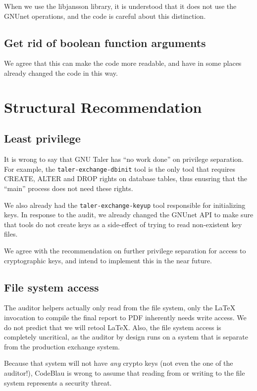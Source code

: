 \documentclass[11pt]{article}
\begin{document}
When we use the libjansson library, it is understood that it does not use
the GNUnet operations, and the code is careful about this distinction.

\subsection{Get rid of boolean function arguments}

We agree that this can make the code more readable, and have in some places
already changed the code in this way.

\section{Structural Recommendation}

\subsection{Least privilege}

It is wrong to say that GNU Taler has ``no work done'' on privilege separation.
For example, the {\tt taler-exchange-dbinit} tool is the only tool that requires
CREATE, ALTER and DROP rights on database tables, thus enusring that the ``main''
process does not need these rights.

We also already had the {\tt taler-exchange-keyup} tool responsible for
initializing keys. In response to the audit, we already changed the GNUnet API
to make sure that tools do not create keys as a side-effect of trying to read
non-existent key files.

We agree with the recommendation on further privilege separation for access
to cryptographic keys, and intend to implement this in the near future.

\subsection{File system access}

The auditor helpers actually only read from the file system, only the LaTeX
invocation to compile the final report to PDF inherently needs write
access. We do not predict that we will retool LaTeX.  Also, the file system
access is completely uncritical, as the auditor by design runs on a system
that is separate from the production exchange system.

Because that system will not have {\em any} crypto keys (not even the one of
the auditor!), CodeBlau is wrong to assume that reading from or writing to the
file system represents a security threat.
\end{document}
